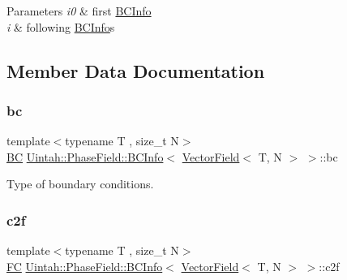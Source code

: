 \begin{DoxyParams}{Parameters}
{\em i0} & first \hyperlink{structUintah_1_1PhaseField_1_1BCInfo}{B\+C\+Info} \\
\hline
{\em i} & following \hyperlink{structUintah_1_1PhaseField_1_1BCInfo}{B\+C\+Info}\textquotesingle{}s \\
\hline
\end{DoxyParams}


\subsection{Member Data Documentation}
\mbox{\label{structUintah_1_1PhaseField_1_1BCInfo_3_01VectorField_3_01T_00_01N_01_4_01_4_adc26b61112f16d2e2117d86dea179b34}} 
\subsubsection{\texorpdfstring{bc}{bc}}
{\footnotesize\ttfamily template$<$typename T , size\+\_\+t N$>$ \\
\hyperlink{namespaceUintah_1_1PhaseField_a148fba372aa3be96fd6eede7a2fa10b5}{BC} \hyperlink{structUintah_1_1PhaseField_1_1BCInfo}{Uintah\+::\+Phase\+Field\+::\+B\+C\+Info}$<$ \hyperlink{structUintah_1_1PhaseField_1_1VectorField}{Vector\+Field}$<$ T, N $>$ $>$\+::bc}



Type of boundary conditions. 

\mbox{\label{structUintah_1_1PhaseField_1_1BCInfo_3_01VectorField_3_01T_00_01N_01_4_01_4_a9843129baa022ca05ed9cd91834398c0}} 
\subsubsection{\texorpdfstring{c2f}{c2f}}
{\footnotesize\ttfamily template$<$typename T , size\+\_\+t N$>$ \\
\hyperlink{namespaceUintah_1_1PhaseField_aeb51fe956fe07f1487f5878f4039f27c}{FC} \hyperlink{structUintah_1_1PhaseField_1_1BCInfo}{Uintah\+::\+Phase\+Field\+::\+B\+C\+Info}$<$ \hyperlink{structUintah_1_1PhaseField_1_1VectorField}{Vector\+Field}$<$ T, N $>$ $>$\+::c2f}



